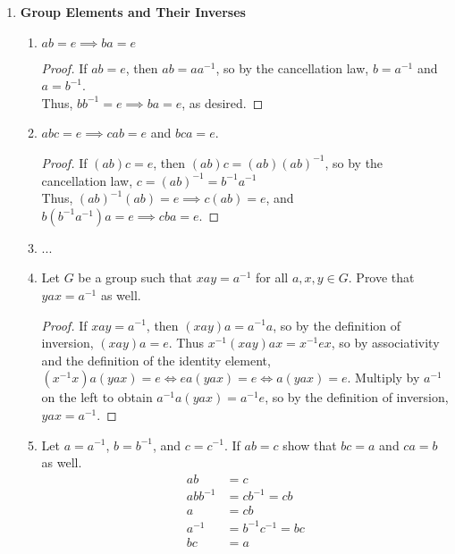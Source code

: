 \begin{enumerate}[label={\Alph*.},font={\bfseries}]
\begin{enumerate}[label={\arabic*},font={\bfseries}]
\begin{proof}
      Next, assume $aba^{-1}b^{-1} = e$.
      Multiplying by $b$ on the right yields $aba^{-1} = b$.
      Then multiplying by $a^{-1}$ on the right yields $ab = ba$.
      Thus $aba^{-1}b^{-1} = e \implies ab = ba$ and $ab = ba \iff aba^{-1}b^{-1} = e$.
    \end{proof}
  \end{enumerate}
\item {\bf Group Elements and Their Inverses}
  \begin{enumerate}[label={\arabic*},font={\bfseries}]
  \item $ab = e \implies ba = e$
    \begin{proof}
      If $ab = e$, then $ab = aa^{-1}$, so by the cancellation law, $b = a^{-1}$ and $a = b^{-1}$. \\
      Thus, $bb^{-1} = e \implies ba = e$, as desired.
    \end{proof}
  \item $abc = e \implies cab = e$ and $bca = e$.
    \begin{proof}
      If $(ab)c = e$, then $(ab)c = (ab)(ab)^{-1}$, so by the cancellation law, $c = (ab)^{-1} = b^{-1}a^{-1}$ \\
      Thus, $(ab)^{-1}(ab) = e \implies c(ab) = e$, and $b(b^{-1}a^{-1})a = e \implies cba = e$.
    \end{proof}
  \item ...
  \item Let $G$ be a group such that $xay = a^{-1}$ for all $a,x,y \in G$.
    Prove that $yax = a^{-1}$ as well.
    \begin{proof}
      If $xay = a^{-1}$, then $(xay)a = a^{-1}a$, so by the definition of inversion, $(xay)a = e$.
      Thus $x^{-1}(xay)ax = x^{-1}ex$, so by associativity and the definition of the identity element, $(x^{-1}x)a(yax) = e \iff ea(yax) = e \iff a(yax) = e$.
      Multiply by $a^{-1}$ on the left to obtain $a^{-1}a(yax) = a^{-1}e$, so by the definition of inversion, $yax = a^{-1}$.
    \end{proof}
  \item Let $a = a^{-1}$, $b = b^{-1}$, and $c = c^{-1}$. If $ab = c$ show that $bc = a$ and $ca = b$ as well.
    \begin{align*}
      ab &= c \\
      abb^{-1} &= cb^{-1} = cb \\
      a &= cb \\
      a^{-1} &= b^{-1}c^{-1} = bc \\
      bc &= a \\

\end{align*}
\end{enumerate}
\end{enumerate}
